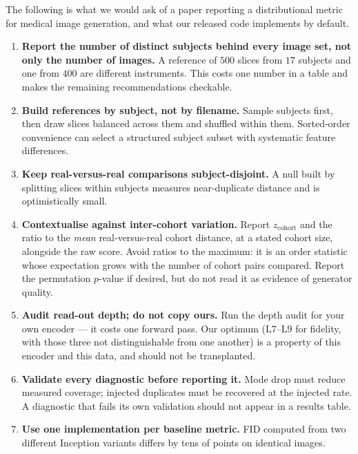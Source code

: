 \documentclass[preprint,12pt,authoryear]{elsarticle}
\newcommand{\Lb}[1]{\ensuremath{\mathrm{L}#1}}
\begin{document}
The following is what we would ask of a paper reporting a distributional metric
for medical image generation, and what our released code implements by default.

\begin{enumerate}[leftmargin=*, topsep=2pt, itemsep=3pt]
\item \textbf{Report the number of distinct subjects behind every image set,
      not only the number of images.} A reference of $500$ slices from $17$
      subjects and one from $400$ are different instruments. This costs one
      number in a table and makes the remaining recommendations checkable.
\item \textbf{Build references by subject, not by filename.} Sample subjects
      first, then draw slices balanced across them and shuffled within them.
      Sorted-order convenience can select a structured subject subset with
      systematic feature differences.
\item \textbf{Keep real-versus-real comparisons subject-disjoint.} A null built
      by splitting slices within subjects measures near-duplicate distance and
      is optimistically small.
\item \textbf{Contextualise against inter-cohort variation.} Report
      $z_{\mathrm{cohort}}$ and the ratio to the \emph{mean} real-versus-real
      cohort distance, at a stated cohort size, alongside the raw score. Avoid
      ratios to the maximum: it is an order statistic whose expectation grows
      with the number of cohort pairs compared. Report the permutation
      $p$-value if desired, but do not read it as evidence of generator
      quality.
\item \textbf{Audit read-out depth; do not copy ours.} Run the depth audit
      for your own encoder --- it costs one forward pass. Our optimum
      (\Lb{7}--\Lb{9} for fidelity, with those three not distinguishable from
      one another) is a property of this encoder and this data, and should not
      be transplanted.
\item \textbf{Validate every diagnostic before reporting it.} Mode drop must
      reduce measured coverage; injected duplicates must be recovered at the
      injected rate. A diagnostic that fails its own validation should not
      appear in a results table.
\item \textbf{Use one implementation per baseline metric.} FID computed from
      two different Inception variants differs by tens of points on identical
      images.
\end{enumerate}
\end{document}
